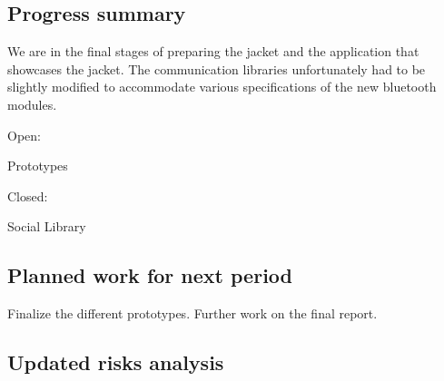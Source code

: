 \subsection{Progress summary}

We are in the final stages of preparing the jacket and the application that showcases the jacket.
The communication libraries unfortunately had to be slightly modified to accommodate various specifications of the new bluetooth modules.

Open:

Prototypes

Closed:

Social Library

\subsection{Planned work for next period}

Finalize the different prototypes. Further work on the final report.

\subsection{Updated risks analysis}
